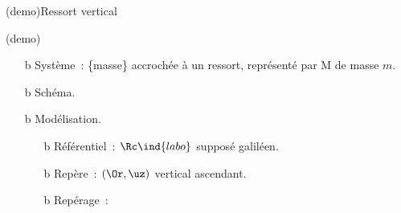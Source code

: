 \documentclass[../../main/main.tex]{subfiles}
\begin{document}
\begin{tcb*}(demo){Ressort vertical}
	\begin{isd}[interior hidden, righthand ratio=.25](demo)
		\begin{enumerate}[label=\sqenumi]
			\item[b]{Système}~: \{masse\} accrochée à un ressort, représenté par M de
			      masse $m$.
			\item[b]{Schéma.}
			\item[b]{Modélisation.}
			      \begin{itemize}
				      \item[b]{Référentiel}~: $\Rc\ind{labo}$ supposé galiléen.
				      \item[b]{Repère}~: $(\Or, \uz)$ vertical ascendant.
				      \item[b]{Repérage}~:
				            \psw{%
					            \[
						            \OM(t) = z(t)\uz
						            \quad ; \quad
						            \vf(t) = \zp(t)\uz
						            \quad ; \quad
						            \af(t) = \zpp(t)\uz
					            \]
				            }%
				            \vspace{-15pt}
			      \end{itemize}
		\end{enumerate}
		\tcblower
		\begin{center}
\end{center}
\end{isd}
\end{tcb*}
\end{document}
